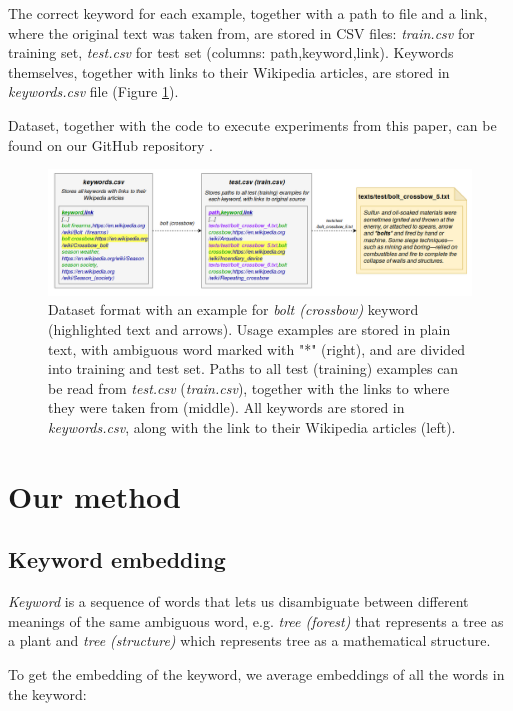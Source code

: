 \documentclass{llncs}
\begin{document}
The correct keyword for each example, together with a path to file and a link, where the original text was taken from, are stored in CSV files: \textit{train.csv} for training set, \textit{test.csv} for test set (columns: path,keyword,link).
Keywords themselves, together with links to their Wikipedia articles, are stored in \textit{keywords.csv} file (Figure \ref{fig:dataset_format}).

Dataset, together with the code to execute experiments from this paper, can be found on our GitHub repository \cite{repository}.

\begin{figure}
    \centering
    \caption{Dataset format with an example for \textit{bolt (crossbow)} keyword (highlighted text and arrows). Usage examples are stored in plain text, with ambiguous word marked with "*" (right), and are divided into training and test set. Paths to all test (training) examples can be read from \textit{test.csv} (\textit{train.csv}), together with the links to where they were taken from (middle). All keywords are stored in \textit{keywords.csv}, along with the link to their Wikipedia articles (left).}
    \label{fig:dataset_format}
    \includegraphics[scale=0.35]{res/dataset_format.png}
\end{figure}


\section{Our method}
\subsection{Keyword embedding}
\label{sec:kw_embed}
\textit{Keyword} is a sequence of words that lets us disambiguate between different meanings of the same ambiguous word, e.g. \textit{tree (forest)} that represents a tree as a plant and \textit{tree (structure)} which represents tree as a mathematical structure.

To get the embedding of the keyword, we average embeddings of all the words in the keyword:
\end{document}
